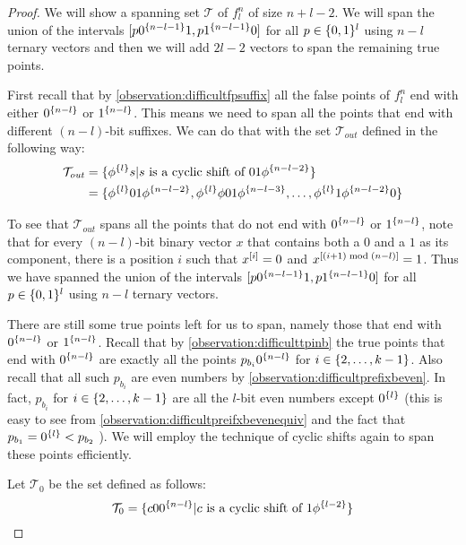 \begin{proof}
We will show a spanning set $\mathcal{T}$
of $f_l^n$ of size $n+l-2$.
We will span the union of the intervals
$[p 0^{\{n-l-1\}} 1, p 1^{\{n-l-1\}} 0]$
for all $p \in \{0, 1\}^l$
using $n-l$ ternary vectors
and then we will add $2l-2$
vectors
to span the remaining true points.

First recall that by \cref{observation:difficultfpsuffix}
all the false points of $f_l^n$
end with either $0^{\{n-l\}}$ or $1^{\{n-l\}}$.
This means we need to span all the points that end
with different $(n-l)$-bit suffixes.
We can do that with the set $\mathcal{T}_{\mathit{out}}$
defined in the following way:
\begin{align*}
\mathcal{T}_{\mathit{out}}
&= \{\phi^{\{l\}} s
| s \text{ is a cyclic shift of } 01 \phi^{\{n-l-2\}}\} \\
&= \{
\phi^{\{l\}} 01 \phi^{\{n-l-2\}},
\phi^{\{l\}} \phi 01 \phi^{\{n-l-3\}},
\ldots,
\phi^{\{l\}} 1 \phi^{\{n-l-2\}} 0
\}
\end{align*}

To see that $\mathcal{T}_{\mathit{out}}$
spans all the points
that do not end with $0^{\{n-l\}}$ or $1^{\{n-l\}}$,
note that for every $(n-l)$-bit binary vector $x$
that contains both a $0$ and a $1$ as its component,
there is a position $i$
such that $x^{[i]} = 0$
and $x^{[(i+1) \bmod (n-l)]} = 1$.
Thus we have spanned the union of the intervals
$[p 0^{\{n-l-1\}} 1, p 1^{\{n-l-1\}} 0]$
for all $p \in \{0, 1\}^l$
using $n-l$ ternary vectors.

There are still some true points left for us to span,
namely those that end with $0^{\{n-l\}}$
or $1^{\{n-l\}}$.
Recall that by \cref{observation:difficulttpinb}
the true points that end with $0^{\{n-l\}}$
are exactly all the points $p_{b_i} 0^{\{n-l\}}$
for $i \in \{2, \ldots, k-1\}$.
Also recall that all such $p_{b_i}$ are even numbers
by \cref{observation:difficultprefixbeven}.
In fact,
$p_{b_i}$ for $i \in \{2, \ldots, k-1\}$
are all the $l$-bit even numbers except $0^{\{l\}}$
(this is easy to see from
\cref{observation:difficultpreifxbevenequiv}
and the fact that $p_{b_1} = 0^{\{l\}} < p_{b_2}$
).
We will employ the technique of cyclic shifts
again
to span these points efficiently.

Let $\mathcal{T}_0$ be the set defined as follows:
$$
\mathcal{T}_0 = \{c 0 0^{\{n-l\}}
| c \text{ is a cyclic shift of } 1 \phi^{\{l-2\}}\}
$$


\end{proof}
